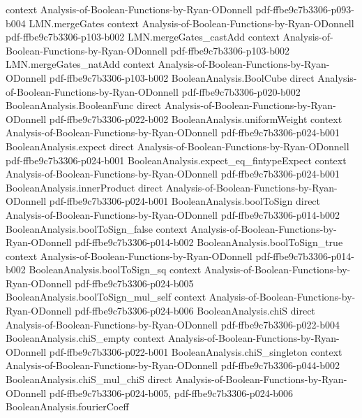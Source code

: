 \begin{lemma}
  {context}
  {Analysis-of-Boolean-Functions-by-Ryan-ODonnell}
  {pdf-ffbe9c7b3306-p093-b004}
\proofstep
  {LMN.mergeGates}
  {context}
  {Analysis-of-Boolean-Functions-by-Ryan-ODonnell}
  {pdf-ffbe9c7b3306-p103-b002}
\proofstep
  {LMN.mergeGates_castAdd}
  {context}
  {Analysis-of-Boolean-Functions-by-Ryan-ODonnell}
  {pdf-ffbe9c7b3306-p103-b002}
\proofstep
  {LMN.mergeGates_natAdd}
  {context}
  {Analysis-of-Boolean-Functions-by-Ryan-ODonnell}
  {pdf-ffbe9c7b3306-p103-b002}
\proofstep
  {BooleanAnalysis.BoolCube}
  {direct}
  {Analysis-of-Boolean-Functions-by-Ryan-ODonnell}
  {pdf-ffbe9c7b3306-p020-b002}
\proofstep
  {BooleanAnalysis.BooleanFunc}
  {direct}
  {Analysis-of-Boolean-Functions-by-Ryan-ODonnell}
  {pdf-ffbe9c7b3306-p022-b002}
\proofstep
  {BooleanAnalysis.uniformWeight}
  {context}
  {Analysis-of-Boolean-Functions-by-Ryan-ODonnell}
  {pdf-ffbe9c7b3306-p024-b001}
\proofstep
  {BooleanAnalysis.expect}
  {direct}
  {Analysis-of-Boolean-Functions-by-Ryan-ODonnell}
  {pdf-ffbe9c7b3306-p024-b001}
\proofstep
  {BooleanAnalysis.expect_eq_fintypeExpect}
  {context}
  {Analysis-of-Boolean-Functions-by-Ryan-ODonnell}
  {pdf-ffbe9c7b3306-p024-b001}
\proofstep
  {BooleanAnalysis.innerProduct}
  {direct}
  {Analysis-of-Boolean-Functions-by-Ryan-ODonnell}
  {pdf-ffbe9c7b3306-p024-b001}
\proofstep
  {BooleanAnalysis.boolToSign}
  {direct}
  {Analysis-of-Boolean-Functions-by-Ryan-ODonnell}
  {pdf-ffbe9c7b3306-p014-b002}
\proofstep
  {BooleanAnalysis.boolToSign_false}
  {context}
  {Analysis-of-Boolean-Functions-by-Ryan-ODonnell}
  {pdf-ffbe9c7b3306-p014-b002}
\proofstep
  {BooleanAnalysis.boolToSign_true}
  {context}
  {Analysis-of-Boolean-Functions-by-Ryan-ODonnell}
  {pdf-ffbe9c7b3306-p014-b002}
\proofstep
  {BooleanAnalysis.boolToSign_sq}
  {context}
  {Analysis-of-Boolean-Functions-by-Ryan-ODonnell}
  {pdf-ffbe9c7b3306-p024-b005}
\proofstep
  {BooleanAnalysis.boolToSign_mul_self}
  {context}
  {Analysis-of-Boolean-Functions-by-Ryan-ODonnell}
  {pdf-ffbe9c7b3306-p024-b006}
\proofstep
  {BooleanAnalysis.chiS}
  {direct}
  {Analysis-of-Boolean-Functions-by-Ryan-ODonnell}
  {pdf-ffbe9c7b3306-p022-b004}
\proofstep
  {BooleanAnalysis.chiS_empty}
  {context}
  {Analysis-of-Boolean-Functions-by-Ryan-ODonnell}
  {pdf-ffbe9c7b3306-p022-b001}
\proofstep
  {BooleanAnalysis.chiS_singleton}
  {context}
  {Analysis-of-Boolean-Functions-by-Ryan-ODonnell}
  {pdf-ffbe9c7b3306-p044-b002}
\proofstep
  {BooleanAnalysis.chiS_mul_chiS}
  {direct}
  {Analysis-of-Boolean-Functions-by-Ryan-ODonnell}
  {pdf-ffbe9c7b3306-p024-b005,
    pdf-ffbe9c7b3306-p024-b006}
\proofstep
  {BooleanAnalysis.fourierCoeff}

\end{lemma}
